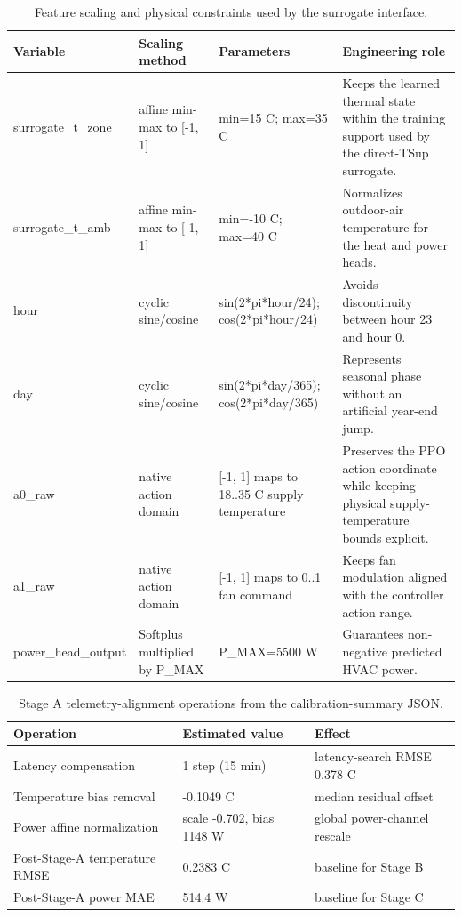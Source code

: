 \documentclass[11pt,a4paper]{article}
\begin{document}
\begin{table}[H]
\centering
\scriptsize
\caption{Feature scaling and physical constraints used by the surrogate interface.}
\label{tab:v3-scaling}
\begin{tabularx}{\linewidth}{lXXX}
\toprule
Variable & Scaling method & Parameters & Engineering role \\
\midrule
surrogate\_t\_zone & affine min-max to [-1, 1] & min=15 C; max=35 C & Keeps the learned thermal state within the training support used by the direct-TSup surrogate. \\
surrogate\_t\_amb & affine min-max to [-1, 1] & min=-10 C; max=40 C & Normalizes outdoor-air temperature for the heat and power heads. \\
hour & cyclic sine/cosine & sin(2*pi*hour/24); cos(2*pi*hour/24) & Avoids discontinuity between hour 23 and hour 0. \\
day & cyclic sine/cosine & sin(2*pi*day/365); cos(2*pi*day/365) & Represents seasonal phase without an artificial year-end jump. \\
a0\_raw & native action domain & [-1, 1] maps to 18..35 C supply temperature & Preserves the PPO action coordinate while keeping physical supply-temperature bounds explicit. \\
a1\_raw & native action domain & [-1, 1] maps to 0..1 fan command & Keeps fan modulation aligned with the controller action range. \\
power\_head\_output & Softplus multiplied by P\_MAX & P\_MAX=5500 W & Guarantees non-negative predicted HVAC power. \\
\bottomrule
\end{tabularx}
\end{table}
\begin{table}[H]
\centering
\small
\caption{Stage A telemetry-alignment operations from the calibration-summary JSON.}
\label{tab:stage-a}
\begin{tabularx}{\linewidth}{llX}
\toprule
Operation & Estimated value & Effect \\
\midrule
Latency compensation & 1 step (15 min) & latency-search RMSE 0.378 C \\
Temperature bias removal & -0.1049 C & median residual offset \\
Power affine normalization & scale -0.702, bias 1148 W & global power-channel rescale \\
Post-Stage-A temperature RMSE & 0.2383 C & baseline for Stage B \\
Post-Stage-A power MAE & 514.4 W & baseline for Stage C \\
\bottomrule
\end{tabularx}
\end{table}
\end{document}
